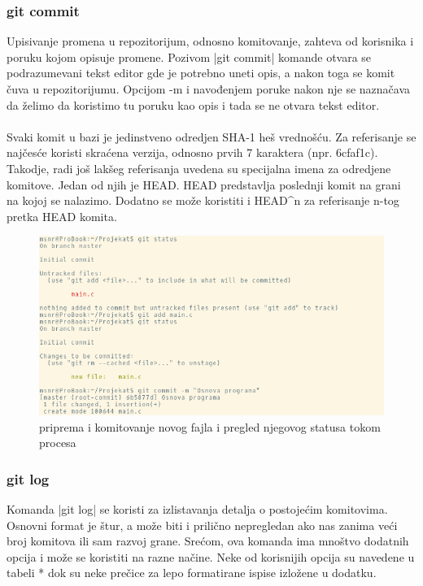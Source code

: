 \documentclass[a4paper]{article}
\begin{document}
{\subsubsection*{git commit}
\label{subsec:git_commit}
Upisivanje promena u repozitorijum, odnosno komitovanje, zahteva od korisnika i poruku kojom opisuje promene. Pozivom |git commit| komande otvara se podrazumevani tekst editor gde je potrebno uneti opis, a nakon toga se komit čuva u repozitorijumu. Opcijom -m i navođenjem poruke nakon nje se naznačava da želimo da koristimo tu poruku kao opis i tada se ne otvara tekst editor.
\\\\
Svaki komit u bazi je jedinstveno odredjen SHA-1 heš vrednošću. Za referisanje se najčesće koristi skraćena verzija, odnosno prvih 7 karaktera (npr. 6cfaf1c).
Takodje, radi još lakšeg referisanja uvedena su specijalna imena za odredjene komitove. Jedan od njih je HEAD. HEAD predstavlja poslednji komit na grani na kojoj se nalazimo. Dodatno se može koristiti i HEAD\^{}n za referisanje n-tog pretka HEAD komita.


\begin{figure}[h!]
\begin{center}
\includegraphics[scale=0.55]{images/commit.png}
\end{center}
\caption{priprema i komitovanje novog fajla i pregled njegovog statusa tokom procesa}
\label{fig:git_commit}
\end{figure}

\subsubsection*{git log}
\label{log}
Komanda |git log| se koristi za izlistavanja detalja o postojećim komitovima. Osnovni format je štur, a može biti i prilično nepregledan ako nas zanima veći broj komitova ili sam razvoj grane. Srećom, ova komanda ima mnoštvo dodatnih opcija i može se koristiti na razne načine. Neke od korisnijih opcija su navedene u tabeli * dok su neke prečice za lepo formatirane ispise izložene u dodatku. 

}
\end{document}

